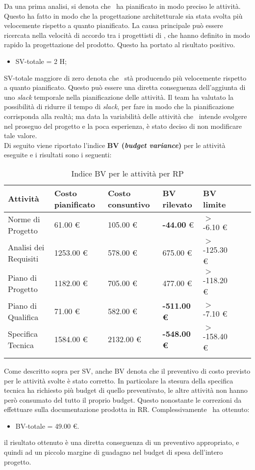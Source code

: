 Da una prima analisi, si denota che \gruppo ~ha pianificato in modo preciso le attività.
Questo ha fatto in modo che la progettazione architetturale sia stata svolta più velocemente rispetto a quanto pianificato. La causa principale può essere ricercata nella velocità di accordo tra i progettisti di \gruppo, che hanno definito in modo rapido la progettazione del prodotto. Questo ha portato al risultato positivo.
\begin{itemize}
\item SV-totale = 2 H;
\end{itemize}
SV-totale maggiore di zero denota che \gruppo ~stà producendo più velocemente rispetto a quanto pianificato. Questo può essere una diretta conseguenza dell'aggiunta di uno \textit{slack} temporale nella pianificazione delle attività.
Il team ha valutato la possibilità di ridurre il tempo di \textit{slack}, per fare in modo che la pianificazione corrisponda alla realtà; ma data la variabilità delle attività che \gruppo ~intende svolgere nel proseguo del progetto e la poca esperienza, è stato deciso di non modificare tale valore.\\
Di seguito viene riportato l'indice \textbf{BV (\textit{budget variance})} per le attività eseguite e i risultati sono i seguenti:
\begin{longtable}{lllllXr}
\toprule
\textbf{Attività} & \textbf{Costo pianificato} & \textbf{Costo consuntivo} & \textbf{BV rilevato} & \textbf{BV limite} \\
\toprule
Norme di Progetto & 61.00 € & 105.00 € & \textbf{-44.00} € & $>$ -6.10 €\\
\midrule
Analisi dei Requisiti & 1253.00 € & 578.00 € & 675.00 € & $>$ -125.30 €\\
\midrule
Piano di Progetto & 1182.00 € & 705.00 € & 477.00 € & $>$ -118.20 €\\
\midrule
Piano di Qualifica & 71.00 € & 582.00 € & \textbf{-511.00 €} & $>$ -7.10 €\\
\midrule
Specifica Tecnica & 1584.00 € & 2132.00 € & \textbf{-548.00 €} & $>$ -158.40 €\\
\bottomrule
\caption{Indice BV per le attività per RP}
\end{longtable}
Come descritto sopra per SV, anche BV denota che il preventivo di costo previsto per le attività svolte è stato corretto.
In particolare la stesura della specifica tecnica ha richiesto più budget di quello preventivato, le altre attività non hanno però consumato del tutto il proprio budget. Questo nonostante le correzioni da effettuare sulla documentazione prodotta in RR.
Complessivamente \gruppo ~ha ottenuto:
\begin{itemize}
\item BV-totale = 49.00 €.
\end{itemize}
il risultato ottenuto è una diretta conseguenza di un preventivo appropriato, e quindi ad un piccolo margine di guadagno nel budget di spesa dell'intero progetto.
